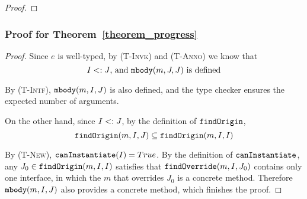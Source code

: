\begin{proof}
\begin{comment}
\noindent \textbf{Case Super-Invk.}
let \[ e = \kwsuper.K::m(\overline{\angl{I_e}} \overline{e}) \]   
Suppose \[ \mbody(m, K, K) = (J', \overline{I_x} \; \overline{x}, I_{e_0} \; e_0) \] 
then \[ e' =  [\overline{\angl{I_x}} \overline{e}/\overline{x}] e_0 \] 
By rules \textsc{(T-New)} and \textsc{(T-Invk)}, 
  \[ 
     \mtype(m, K, K) = \overline{I_x} \rightarrow I_{e_0} \quad 
     \judgeewf \Gamma {\overline{e} : \overline{I_e'}} \quad
     \overline{I_e'} \subtype \overline{I_x} \quad
     \textit{, for some } \; \overline{I_e'}
  \]
By Lemma~\ref{lemma0},
    \[
    \judgeewf {\Gamma, \overline{x}:\overline{I_x}, \kwthis:J_0} {e_0:I_f} \textit{, for some } K \subtype J_0 \textit{ and } I_f \subtype I_{e_0}
    \]
By Lemma~\ref{lemma1},
    \[
    \judgeewf {\Gamma} {[\overline{\angl{I_x}} \overline{e}/\overline{x} ] e_0  :  I_g} \textit{, for some } I_g \subtype I_f 
    \]
So $I_g <: I_{e_0}$, finally just let $I' = I_g$.

\end{comment}
\end{proof}

\subsubsection{Proof for Theorem~\ref{theorem_progress}}
\begin{proof}
	
Since $e$ is well-typed, by \textsc{(T-Invk)} and \textsc{(T-Anno)} we know that
$$I <: J\textrm{, and }\texttt{mbody}(m, J, J) \textrm{ is defined}$$

By \textsc{(T-Intf)}, $\texttt{mbody}(m, I, J)$ is also defined, and the type checker ensures the expected number of arguments.

On the other hand, since $I <: J$, by the definition of $\texttt{findOrigin}$, $$\texttt{findOrigin}(m, I, J) \subseteq \texttt{findOrigin}(m, I, I)$$

By \textsc{(T-New)}, $\texttt{canInstantiate}(I) = True$. By the definition of $\texttt{canInstantiate}$, any $J_0\in\texttt{findOrigin}(m, I, I)$ satisfies that
$\texttt{findOverride}(m, I, J_0)$ contains only one interface, in which the $m$ that overrides $J_0$ is a concrete method. Therefore $\texttt{mbody}(m, I, J)$ also provides a concrete method, which finishes the proof.
\end{proof}